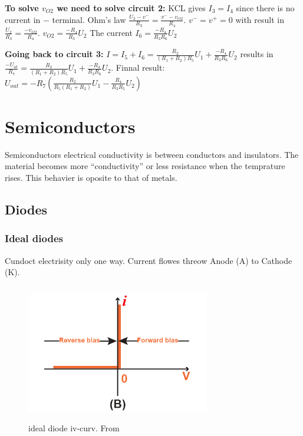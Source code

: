 \textbf{To solve $v_{O2}$ we need to solve circuit 2:} \newline
KCL gives $I_3=I_4$ since there is no current in $-$ terminal. \newline
Ohm's law $\frac{U_2-v^-}{R_3}=\frac{v^--v_{O2}}{R_4}$. \newline
$v^-=v^+=0$ with result in $\frac{U_2}{R_3}=\frac{-v_{O2}}{R_4}$. \newline
$v_{O2}=\frac{-R_4}{R_3}U_2$ \newline
The current $I_6=\frac{-R_4}{R_3R_6}U_2$ \newline
\vspace{3mm}

\textbf{Going back to circuit 3:} \newline
$I=I_5+I_6=\frac{R_2}{(R_1+R_2)R_5}U_1+\frac{-R_4}{R_3R_6}U_2$ \newline
results in $\frac{-U_{ut}}{R_7}=\frac{R_2}{(R_1+R_2)R_5}U_1+\frac{-R_4}{R_3R_6}U_2$. \newline
Finnal result: $U_{out}=-R_7(\frac{R_2}{R_5(R_1+R_2)}U_1-\frac{R_4}{R_3R_5}U_2)$

\newpage
\section{Semiconductors}
Semiconductors electrical conductivity is between conductors and insulators.
The material becomes more ``conductivity'' or less resistance when the temprature
rises. This behavier is oposite to that of metals.

\subsection{Diodes}
\subsubsection{Ideal diodes}
Cundoct electrisity only one way. Current flowes threow Anode (A) to Cathode (K).
\begin{figure}[h]
    \centering
    \includegraphics[width=8cm, height=6cm]{image/ideal-diode.jpg}
    \caption{ideal diode iv-curv. From \cite{}}
\end{figure}


